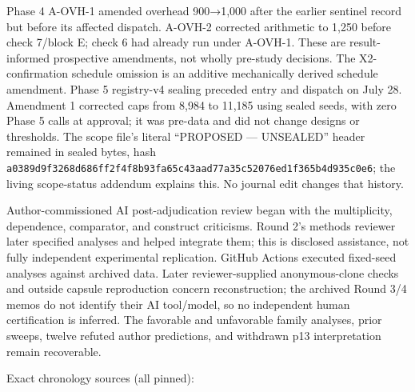 \documentclass[11pt]{article}
\begin{document}
Phase 4 A-OVH-1 amended overhead 900→1,000 after the earlier sentinel
record but before its affected dispatch. A-OVH-2 corrected arithmetic to
1,250 before check 7/block E; check 6 had already run under A-OVH-1.
These are result-informed prospective amendments, not wholly pre-study
decisions. The X2-confirmation schedule omission is an additive
mechanically derived schedule amendment. Phase 5 registry-v4 sealing
preceded entry and dispatch on July 28. Amendment 1 corrected caps from
8,984 to 11,185 using sealed seeds, with zero Phase 5 calls at approval;
it was pre-data and did not change designs or thresholds. The scope
file's literal ``PROPOSED --- UNSEALED'' header remained in sealed
bytes, hash
\nolinkurl{a0389d9f3268d686ff2f4f8b93fa65c43aad77a35c52076ed1f365b4d935c0e6};
the living scope-status addendum explains this. No journal edit changes
that history.

Author-commissioned AI post-adjudication review began with the
multiplicity, dependence, comparator, and construct criticisms. Round
2's methods reviewer later specified analyses and helped integrate them;
this is disclosed assistance, not fully independent experimental
replication. GitHub Actions executed fixed-seed analyses against
archived data. Later reviewer-supplied anonymous-clone checks and
outside capsule reproduction concern reconstruction; the archived Round
3/4 memos do not identify their AI tool/model, so no independent human
certification is inferred. The favorable and unfavorable family
analyses, prior sweeps, twelve refuted author predictions, and withdrawn
p13 interpretation remain recoverable.

Exact chronology sources (all pinned):
\end{document}
